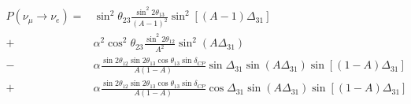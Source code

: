 \begin{equation}
    \begin{aligned}
        P(\nu_\mu\rightarrow\nu_e) = & \sin^2\theta_{23}\frac{\sin^2 2\theta_{13}}{(A - 1)^2}\sin^2[(A-1)\Delta_{31}]                                                             \\
        +                            & \alpha^2\cos^2\theta_{23}\frac{\sin^2 2\theta_{12}}{A^2}\sin^2(A\Delta_{31})                                                               \\
        -                            & \alpha\frac{\sin2\theta_{12}\sin2\theta_{13}\cos\theta_{13}\sin\delta_{CP}}{A(1-A)}\sin\Delta_{31}\sin(A\Delta_{31})\sin[(1-A)\Delta_{31}] \\
        +                            & \alpha\frac{\sin2\theta_{12}\sin2\theta_{13}\cos\theta_{13}\sin\delta_{CP}}{A(1-A)}\cos\Delta_{31}\sin(A\Delta_{31})\sin[(1-A)\Delta_{31}]
    \end{aligned}
    \label{eq:nue_appearance_probability_full}
\end{equation}
